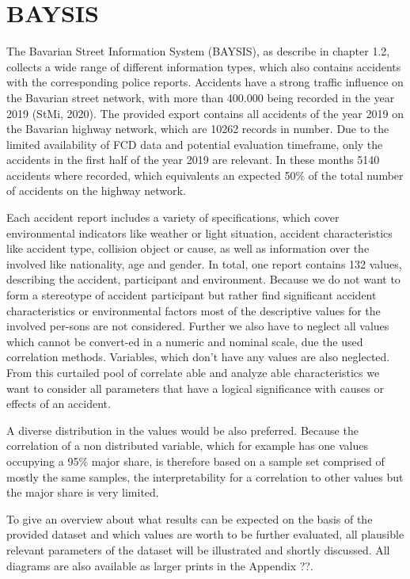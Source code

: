 \documentclass[a4paper,12pt]{report}
\begin{document}
\section{BAYSIS}
\par The Bavarian Street Information System (BAYSIS), as describe in chapter 1.2, collects a wide range of different information types, which also contains accidents with the corresponding police reports. Accidents have a strong traffic influence on the Bavarian street network, with more than 400.000 being recorded in the year 2019 (StMi, 2020). The provided export contains all accidents of the year 2019 on the Bavarian highway network, which are 10262 records in number. Due to the limited availability of FCD data and potential evaluation timeframe, only the accidents in the first half of the year 2019 are relevant. In these months 5140 accidents where recorded, which equivalents an expected 50\% of the total number of accidents on the highway network. 
\par Each accident report includes a variety of specifications, which cover environmental indicators like weather or light situation, accident characteristics like accident type, collision object or cause, as well as information over the involved like nationality, age and gender. In total, one report contains 132 values, describing the accident, participant and environment. Because we do not want to form a stereotype of accident participant but rather find significant accident characteristics or environmental factors most of the descriptive values for the involved per-sons are not considered. Further we also have to neglect all values which cannot be convert-ed in a numeric and nominal scale, due the used correlation methods. Variables, which don’t have any values are also neglected. From this curtailed pool of correlate able and analyze able characteristics we want to consider all parameters that have a logical significance with causes or effects of an accident. 
\par A diverse distribution in the values would be also preferred. Because the correlation of a non distributed variable, which for example has one values occupying a 95\% major share, is therefore based on a sample set comprised of mostly the same samples, the interpretability for a correlation to other values but the major share is very limited.
\newline
\par To give an overview about what results can be expected on the basis of the provided dataset and which values are worth to be further evaluated, all plausible relevant parameters of the dataset will be illustrated and shortly discussed. All diagrams are also available as larger prints in the Appendix ??. 
\end{document}

